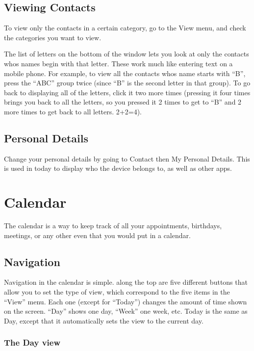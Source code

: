 \documentclass[12pt,letterpaper,oneside, openany]{book} \usepackage[latin1] {inputenc}
\begin{document}
\section{Viewing Contacts}

To view only the contacts in a certain category, go to the View menu, and check the categories you want to view. 

The list of letters on the bottom of the window lets you look at only the contacts whos names begin with that letter. These work much like entering text on a mobile phone. For example, to view all the contacts whos name starts with ``B'', press the ``ABC'' group twice (since ``B'' is the second letter in that group). To go back to displaying all of the letters, click it two more times (pressing it four times brings you back to all the letters, so you pressed it 2 times to get to ``B'' and 2 more times to get back to all letters. 2+2=4). 


\section{Personal Details}

Change your personal details by going to Contact then My Personal Details. This is used in today to display who the device belongs to, as well as other apps.

\chapter{Calendar}
The calendar is a way to keep track of all your appointments, birthdays, meetings, or any other even that you would put in a calendar.

\section{Navigation}

Navigation in the calendar is simple. along the top are five different buttons that allow you to set the type of view, which correspond to the five items in the ``View'' menu. Each one (except for ``Today'') changes the amount of time shown on the screen. ``Day'' shows one day, ``Week'' one week, etc. Today is the same as Day, except that it automatically sets the view to the current day. 

\subsection{The Day view}
\end{document}
